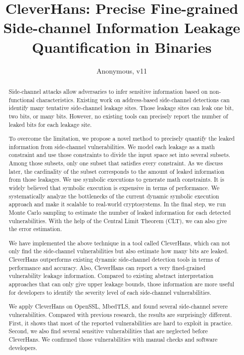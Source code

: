 \documentclass[conference]{IEEEtran}
\newcommand{\tool}{TANA}
\renewcommand{\tool}{CleverHans}
\begin{document}
\title{\tool{}: Precise Fine-grained Side-channel Information Leakage Quantification in Binaries}
\author{Anonymous, v11}

\maketitle

\begin{abstract}
    Side-channel attacks allow adversaries to infer sensitive
    information based on non-functional characteristics. 
    Existing work on address-based side-channel detections can identify many tentative side-channel leakage sites. Those leakage sites can leak one bit, two bits, or many bits. However, no existing tools can
    precisely report the number of leaked bits for each leakage site.
       
    To overcome the limitation, we propose a novel method to precisely quantify the leaked information from side-channel vulnerabilities. 
    We model each leakage as a math constraint and use those
    constraints to divide the input space set into several subsets.
    Among those subsets, only one subset that satisfies every constraint.
    As we discuss later, the cardinality of the subset corresponds to the amount of leaked information from those leakages. We use symbolic executions to generate math constraints. It is widely believed that symbolic execution is expensive in terms of performance. We systematically analyze the bottlenecks of the current dynamic symbolic execution approach and make it scalable to real-world cryptosystems. In the final step, we run Monte Carlo sampling to estimate the number of leaked information for each detected vulnerabilities. With the help of the Central Limit Theorem (CLT),
    we can also give the error estimation.

    We have implemented the above technique in a tool called \tool{}, which can not only find the side-channel vulnerabilities but also estimate how many bits are leaked. 
    \tool{} outperforms existing dynamic side-channel detection tools in terms of performance and accuracy. Also, \tool{} can report a very fined-grained vulnerability leakage information.
    Compared to existing abstract interpretation approaches that can only give upper leakage
    bounds, those information are more useful for developers to identify the severity level
    of each side-channel vulnerabilities.
    
    We apply \tool{} on OpenSSL, MbedTLS, and found several side-channel severe vulnerabilities. Compared with previous research, the results are surprisingly different. 
    First, it shows that most of the reported vulnerabilities are hard to exploit in practice. 
    Second, we also find several sensitive vulnerabilities that are neglected before \tool{}. 
    We confirmed those vulnerabilities with manual checks and software developers.

\end{abstract}
\end{document}
